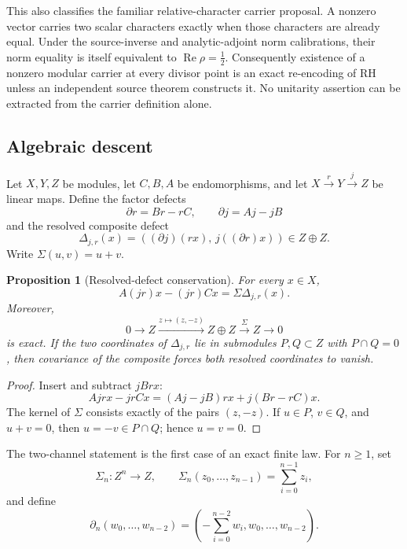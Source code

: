 \documentclass[11pt]{article}
\newtheorem{proposition}[theorem]{Proposition}
\theoremstyle{definition}
\theoremstyle{remark}
\newcommand{\Rea}{\operatorname{Re}}
\begin{document}
This also classifies the familiar relative-character carrier proposal.  A
nonzero vector carries two scalar characters exactly when those characters
are already equal.  Under the source-inverse and analytic-adjoint norm
calibrations, their norm equality is itself equivalent to
\(\Rea\rho=\tfrac12\).  Consequently existence of a nonzero modular carrier
at every divisor point is an exact re-encoding of RH unless an independent
source theorem constructs it.  No unitarity assertion can be extracted from
the carrier definition alone.

\subsection{Algebraic descent}

Let \(X,Y,Z\) be modules, let \(C,B,A\) be endomorphisms, and let
\(X\xrightarrow rY\xrightarrow jZ\) be linear maps.  Define the factor
defects
\[
       \partial r=Br-rC,\qquad \partial j=Aj-jB
\tag{2.9}\label{eq:factor-defects}
\]
and the resolved composite defect
\[
 \Delta_{j,r}(x)=
 \left((\partial j)(rx),\,j((\partial r)x)\right)\in Z\oplus Z.
\tag{2.10}\label{eq:resolved}
\]
Write \(\Sigma(u,v)=u+v\).

\begin{proposition}[Resolved-defect conservation]
\label{prop:resolved}
For every \(x\in X\),
\[
                  A(jr)x-(jr)Cx=\Sigma\Delta_{j,r}(x).
\tag{2.11}\label{eq:defect-conservation}
\]
Moreover,
\[
 0\longrightarrow Z\xrightarrow{z\mapsto(z,-z)}Z\oplus Z
 \xrightarrow{\Sigma} Z\longrightarrow0
\tag{2.12}\label{eq:augmentation}
\]
is exact.  If the two coordinates of \(\Delta_{j,r}\) lie in submodules
\(P,Q\subset Z\) with \(P\cap Q=0\), then covariance of the composite
forces both resolved coordinates to vanish.
\end{proposition}

\begin{proof}
Insert and subtract \(jBrx\):
\[
 Ajrx-jrCx=(Aj-jB)rx+j(Br-rC)x.
\]
The kernel of \(\Sigma\) consists exactly of the pairs \((z,-z)\).
If \(u\in P\), \(v\in Q\), and \(u+v=0\), then \(u=-v\in P\cap Q\);
hence \(u=v=0\).
\end{proof}

The two-channel statement is the first case of an exact finite law.  For
\(n\ge1\), set
\[
 \Sigma_n:Z^n\longrightarrow Z,\qquad
 \Sigma_n(z_0,\ldots,z_{n-1})=\sum_{i=0}^{n-1}z_i,
\tag{2.12a}\label{eq:finite-augmentation}
\]
and define
\[
 \partial_n(w_0,\ldots,w_{n-2})
   =\left(-\sum_{i=0}^{n-2}w_i,w_0,\ldots,w_{n-2}\right).
\tag{2.12b}\label{eq:finite-boundary}
\]
\end{document}
